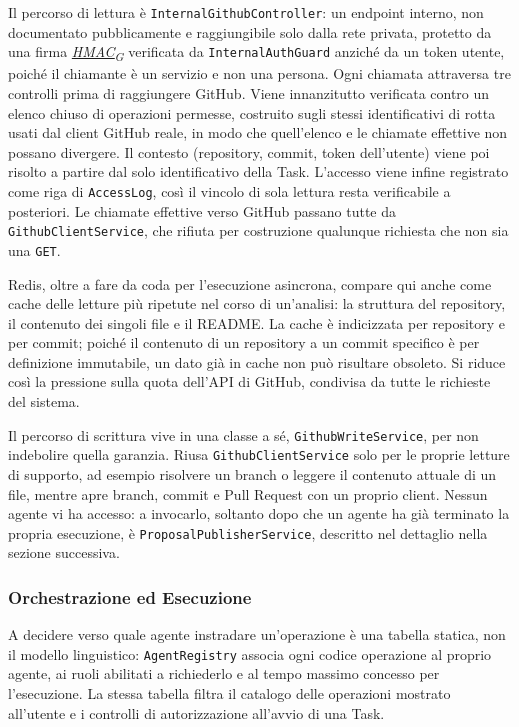 \documentclass[12pt, a4paper]{article}
\newcommand{\urlglossario}{https://skynetunigroup.github.io/Code_Guardian/Documentazione/PB/glossario_v2.0.0.pdf}
\newcommand{\glo}[2]{\href{\urlglossario\#nameddest=#2}{#1\textsubscript{G}}}
\begin{document}
Il percorso di lettura è \texttt{InternalGithubController}: un endpoint interno, non documentato pubblicamente e raggiungibile solo dalla rete privata, protetto da una firma \textit{\glo{HMAC}{hmac}} verificata da \texttt{InternalAuthGuard} anziché da un token utente, poiché il chiamante è un servizio e non una persona. Ogni chiamata attraversa tre controlli prima di raggiungere GitHub. Viene innanzitutto verificata contro un elenco chiuso di operazioni permesse, costruito sugli stessi identificativi di rotta usati dal client GitHub reale, in modo che quell'elenco e le chiamate effettive non possano divergere. Il contesto (repository, commit, token dell'utente) viene poi risolto a partire dal solo identificativo della Task. L'accesso viene infine registrato come riga di \texttt{AccessLog}, così il vincolo di sola lettura resta verificabile a posteriori. Le chiamate effettive verso GitHub passano tutte da \texttt{GithubClientService}, che rifiuta per costruzione qualunque richiesta che non sia una \texttt{GET}.

Redis, oltre a fare da coda per l'esecuzione asincrona, compare qui anche come cache delle letture più ripetute nel corso di un'analisi: la struttura del repository, il contenuto dei singoli file e il README. La cache è indicizzata per repository e per commit; poiché il contenuto di un repository a un commit specifico è per definizione immutabile, un dato già in cache non può risultare obsoleto. Si riduce così la pressione sulla quota dell'API di GitHub, condivisa da tutte le richieste del sistema.

Il percorso di scrittura vive in una classe a sé, \texttt{GithubWriteService}, per non indebolire quella garanzia. Riusa \texttt{GithubClientService} solo per le proprie letture di supporto, ad esempio risolvere un branch o leggere il contenuto attuale di un file, mentre apre branch, commit e Pull Request con un proprio client. Nessun agente vi ha accesso: a invocarlo, soltanto dopo che un agente ha già terminato la propria esecuzione, è \texttt{ProposalPublisherService}, descritto nel dettaglio nella sezione successiva.
\subsubsection{Orchestrazione ed Esecuzione}

A decidere verso quale agente instradare un'operazione è una tabella statica, non il modello linguistico: \texttt{AgentRegistry} associa ogni codice operazione al proprio agente, ai ruoli abilitati a richiederlo e al tempo massimo concesso per l'esecuzione. La stessa tabella filtra il catalogo delle operazioni mostrato all'utente e i controlli di autorizzazione all'avvio di una Task.
\end{document}
